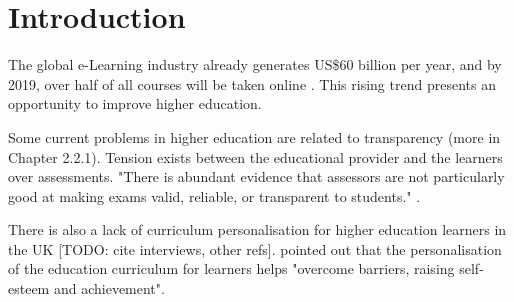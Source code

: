 
\chapter{Introduction}  %



The global e-Learning industry already generates US\$60 billion per year, and by 2019, over half of all courses will be taken 
online \citep[p.17]{panto2013challenge}. This rising trend presents an opportunity to improve higher education.

Some current problems in higher education are related to transparency (more in Chapter 2.2.1). Tension exists between 
the educational provider and the learners over assessments. "There is abundant evidence that assessors are not particularly 
good at making exams valid, reliable, or transparent to students." \citep[p.62]{brown1999assessment}.


There is also a lack of curriculum personalisation for higher education learners in the UK [TODO: cite interviews, other refs]. 
\citet{condie2007impact} pointed out that the personalisation of the education curriculum for learners helps "overcome 
barriers, raising self-esteem and achievement". 

